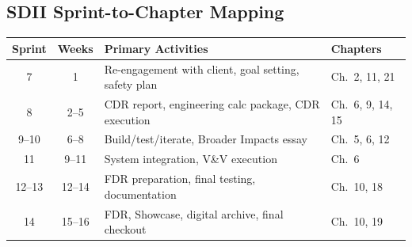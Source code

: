 \subsection*{SDII Sprint-to-Chapter Mapping}
\begin{center}\small
\begin{tabularx}{\textwidth}{c c X l}
\toprule
\textbf{Sprint} & \textbf{Weeks} & \textbf{Primary Activities} & \textbf{Chapters} \\
\midrule
7 & 1 & Re-engagement with client, goal setting, safety plan & Ch.~2, 11, 21 \\
8 & 2--5 & CDR report, engineering calc package, CDR execution & Ch.~6, 9, 14, 15 \\
9--10 & 6--8 & Build/test/iterate, Broader Impacts essay & Ch.~5, 6, 12 \\
11 & 9--11 & System integration, V\&V execution & Ch.~6 \\
12--13 & 12--14 & FDR preparation, final testing, documentation & Ch.~10, 18 \\
14 & 15--16 & FDR, Showcase, digital archive, final checkout & Ch.~10, 19 \\
\bottomrule
\end{tabularx}
\end{center}


